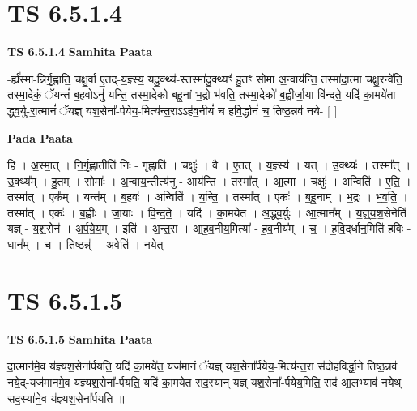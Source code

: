 \documentclass[17pt]{extarticle}
\begin{document}
\section*{ TS 6.5.1.4 }

\textbf{TS 6.5.1.4 } \newline
\textbf{Samhita Paata} \newline

-र्ह्य॑स्मा-न्निर्गृ॒ह्णाति॒ चक्षु॒र्वा ए॒तद्-य॒ज्ञ्स्य॒ यदु॒क्थ्य॑-स्तस्मा॑दु॒क्थ्यꣳ॑ हु॒तꣳ सोमा॑ अ॒न्वाय॑न्ति॒ तस्मा॑दा॒त्मा चक्षु॒रन्वे॑ति॒ तस्मा॒देकं॒ ॅयन्तं॑ ब॒हवोऽनु॑ यन्ति॒ तस्मा॒देको॑ बहू॒नां भ॒द्रो भ॑वति॒ तस्मा॒देको॑ ब॒ह्वीर्जा॒या वि॑न्दते॒ यदि॑ का॒मये॑ता-द्ध्व॒र्यु-रा॒त्मानं॑ ॅयज्ञ् यश॒सेना᳚-र्पयेय॒-मित्य॑न्त॒राऽऽह॑व॒नीयं॑ च हवि॒र्द्धानं॑ च॒ तिष्ठ॒न्नव॑ नये- [  ] \newline

\textbf{Pada Paata} \newline

हि । अ॒स्मा॒त् । नि॒र्गृ॒ह्णातीति॑ निः - गृ॒ह्णाति॑ । चक्षुः॑ । वै । ए॒तत् । य॒ज्ञ्स्य॑ । यत् । उ॒क्थ्यः॑ । तस्मा᳚त् । उ॒क्थ्य᳚म् । हु॒तम् । सोमाः᳚ । अ॒न्वाय॒न्तीत्य॑नु - आय॑न्ति । तस्मा᳚त् । आ॒त्मा । चक्षुः॑ । अन्विति॑ । ए॒ति॒ । तस्मा᳚त् । एक᳚म् । यन्त᳚म् । ब॒हवः॑ । अन्विति॑ । य॒न्ति॒ । तस्मा᳚त् । एकः॑ । ब॒हू॒नाम् । भ॒द्रः । भ॒व॒ति॒ । तस्मा᳚त् । एकः॑ । ब॒ह्वीः । जा॒याः । वि॒न्द॒ते॒ । यदि॑ । का॒मये॑त । अ॒द्ध्व॒र्युः । आ॒त्मान᳚म् । य॒ज्ञ्॒य॒श॒सेनेति॑ यज्ञ् - य॒श॒सेन॑ । अ॒र्प॒ये॒य॒म् । इति॑ । अ॒न्त॒रा । आ॒ह॒व॒नीय॒मित्या᳚ - ह॒व॒नीय᳚म् । च॒ । ह॒वि॒द्‌र्धान॒मिति॑ हविः - धान᳚म् । च॒ । तिष्ठन्न्॑ । अवेति॑ । न॒ये॒त् ।  \newline




\section*{ TS 6.5.1.5 }

\textbf{TS 6.5.1.5 } \newline
\textbf{Samhita Paata} \newline

दा॒त्मान॑मे॒व य॑ज्ञ्यश॒सेना᳚र्पयति॒ यदि॑ का॒मये॑त॒ यज॑मानं ॅयज्ञ् यश॒सेना᳚र्पयेय॒-मित्य॑न्त॒रा स॑दोहविर्द्धा॒ने तिष्ठ॒न्नव॑ नये॒द्-यज॑मानमे॒व य॑ज्ञ्यश॒सेना᳚-र्पयति॒ यदि॑ का॒मये॑त सद॒स्यान्॑ यज्ञ् यश॒सेना᳚-र्पयेय॒मिति॒ सद॑ आ॒लभ्याव॑ नयेथ् सद॒स्या॑ने॒व य॑ज्ञ्यश॒सेना᳚र्पयति ॥ \newline
\end{document}
